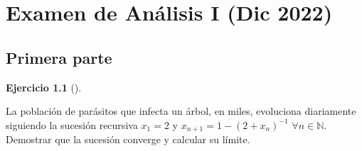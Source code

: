 \documentclass[
  a4paper,
]{scrreport}
\theoremstyle{definition}
\newtheorem{exercise}{Ejercicio}[chapter]
\theoremstyle{remark}
\begin{document}

\hypertarget{examen-de-anuxe1lisis-i-dic-2022}{%
\chapter{Examen de Análisis I (Dic
2022)}\label{examen-de-anuxe1lisis-i-dic-2022}}

\hypertarget{primera-parte}{%
\section{Primera parte}\label{primera-parte}}

\leavevmode{}%
\begin{exercise}[]\label{exr-1}

La población de parásitos que infecta un árbol, en miles, evoluciona
diariamente siguiendo la sucesión recursiva \(x_1=2\) y
\(x_{n+1}=1-(2+x_n)^{-1}\) \(\forall n\in\mathbb{N}\). Demostrar que la
sucesión converge y calcular su límite.

\end{exercise}
\end{document}
